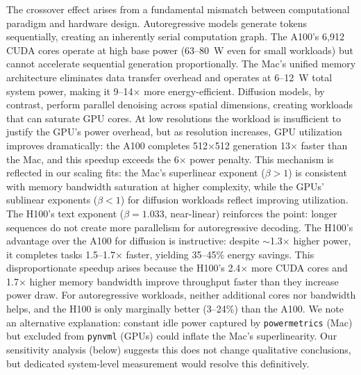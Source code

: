 \documentclass[11pt]{article}
\begin{document}
The crossover effect arises from a fundamental mismatch between computational paradigm and hardware design. Autoregressive models generate tokens sequentially, creating an inherently serial computation graph. The A100's 6,912 CUDA cores operate at high base power (63--80~W even for small workloads) but cannot accelerate sequential generation proportionally. The Mac's unified memory architecture eliminates data transfer overhead and operates at 6--12~W total system power, making it 9--14$\times$ more energy-efficient. Diffusion models\cite{ho2020denoising}, by contrast, perform parallel denoising across spatial dimensions\cite{rombach2022high,guo2024animatediff}, creating workloads that can saturate GPU cores. At low resolutions the workload is insufficient to justify the GPU's power overhead, but as resolution increases, GPU utilization improves dramatically: the A100 completes 512$\times$512 generation 13$\times$ faster than the Mac, and this speedup exceeds the 6$\times$ power penalty. This mechanism is reflected in our scaling fits: the Mac's superlinear exponent ($\beta > 1$) is consistent with memory bandwidth saturation at higher complexity, while the GPUs' sublinear exponents ($\beta < 1$) for diffusion workloads reflect improving utilization. The H100's text exponent ($\beta = 1.033$, near-linear) reinforces the point: longer sequences do not create more parallelism for autoregressive decoding. The H100's advantage over the A100 for diffusion is instructive: despite $\sim$1.3$\times$ higher power, it completes tasks 1.5--1.7$\times$ faster, yielding 35--45\% energy savings. This disproportionate speedup arises because the H100's 2.4$\times$ more CUDA cores and 1.7$\times$ higher memory bandwidth improve throughput faster than they increase power draw. For autoregressive workloads, neither additional cores nor bandwidth helps, and the H100 is only marginally better (3--24\%) than the A100. We note an alternative explanation: constant idle power captured by \texttt{powermetrics} (Mac) but excluded from \texttt{pynvml} (GPUs) could inflate the Mac's superlinearity. Our sensitivity analysis (below) suggests this does not change qualitative conclusions, but dedicated system-level measurement would resolve this definitively.
\end{document}
